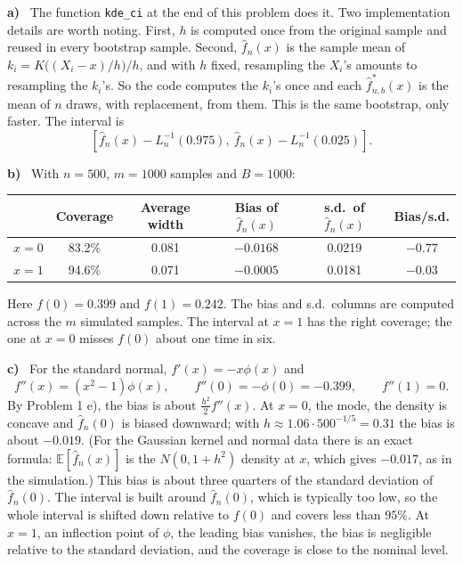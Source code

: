 \documentclass[11pt]{article}
\newcommand{\E}{\mathbb{E}}
\theoremstyle{plain}
\newcounter{problem}
\newcommand{\itm}[1]{\par\textbf{#1)}\ }
\begin{document}
\itm{a}
The function \texttt{kde\_ci} at the end of this problem does it. Two implementation details are worth noting. First, $h$ is computed once from the original sample and reused in every bootstrap sample. Second, $\hat f_n(x)$ is the sample mean of $k_i = K\big((X_i-x)/h\big)/h$, and with $h$ fixed, resampling the $X_i$'s amounts to resampling the $k_i$'s. So the code computes the $k_i$'s once and each $\hat f^*_{n,b}(x)$ is the mean of $n$ draws, with replacement, from them. This is the same bootstrap, only faster. The interval is
\[
\left[\hat f_n(x)-L_n^{-1}(0.975),\ \hat f_n(x)-L_n^{-1}(0.025)\right].
\]

\itm{b}
With $n=500$, $m=1000$ samples and $B=1000$:

\begin{table}[H]
	\centering
	\begin{tabular}{lccccc}
		\toprule
		& Coverage & Average width & Bias of $\hat f_n(x)$ & s.d.\ of $\hat f_n(x)$ & Bias/s.d. \\
		\midrule
		$x=0$ & 83.2\% & 0.081 & $-0.0168$ & 0.0219 & $-0.77$ \\
		$x=1$ & 94.6\% & 0.071 & $-0.0005$ & 0.0181 & $-0.03$ \\
		\bottomrule
	\end{tabular}
\end{table}

Here $f(0)=0.399$ and $f(1)=0.242$. The bias and s.d.\ columns are computed across the $m$ simulated samples. The interval at $x=1$ has the right coverage; the one at $x=0$ misses $f(0)$ about one time in six.

\itm{c}
For the standard normal, $f'(x)=-x\phi(x)$ and
\[
f''(x) = (x^2-1)\phi(x),\qquad f''(0) = -\phi(0) = -0.399,\qquad f''(1) = 0 .
\]
By Problem 1 e), the bias is about $\frac{h^2}{2}f''(x)$. At $x=0$, the mode, the density is concave and $\hat f_n(0)$ is biased downward; with $h\approx 1.06\cdot 500^{-1/5}=0.31$ the bias is about $-0.019$. (For the Gaussian kernel and normal data there is an exact formula: $\E[\hat f_n(x)]$ is the $N(0,1+h^2)$ density at $x$, which gives $-0.017$, as in the simulation.) This bias is about three quarters of the standard deviation of $\hat f_n(0)$. The interval is built around $\hat f_n(0)$, which is typically too low, so the whole interval is shifted down relative to $f(0)$ and covers less than $95\%$. At $x=1$, an inflection point of $\phi$, the leading bias vanishes, the bias is negligible relative to the standard deviation, and the coverage is close to the nominal level.
\end{document}
